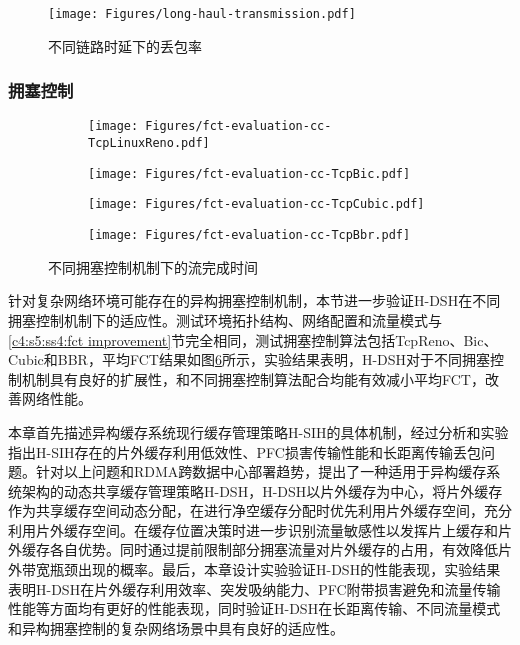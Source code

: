 \begin{figure}[H]
  \centering
  \texttt{[image: Figures/long-haul-transmission.pdf]}
  \caption{不同链路时延下的丢包率}
  \label{c4:s1:ss1:lossless distance}
\end{figure}

\subsubsection{拥塞控制}

\begin{figure}[H]
  \begin{subfigure}[b]{0.47\linewidth}
      \centering
      \texttt{[image: Figures/fct-evaluation-cc-TcpLinuxReno.pdf]}
      \label{c3:s6:ss1:fig:sub1:fct tcp reno}
  \end{subfigure}
  \begin{subfigure}[b]{0.47\linewidth}
      \centering
      \texttt{[image: Figures/fct-evaluation-cc-TcpBic.pdf]}
      \label{c3:s6:ss1:fig:sub1:fct tcp bic}
  \end{subfigure}
  \begin{subfigure}[b]{0.47\linewidth}
    \centering
    \texttt{[image: Figures/fct-evaluation-cc-TcpCubic.pdf]}
    \label{c3:s6:ss1:fig:sub1:fct tcp cubic}
  \end{subfigure}
  \begin{subfigure}[b]{0.47\linewidth}
    \centering
    \texttt{[image: Figures/fct-evaluation-cc-TcpBbr.pdf]}
    \label{c3:s6:ss1:fig:sub1:fct tcp bbr}
  \end{subfigure}  
  \caption{不同拥塞控制机制下的流完成时间}
  \label{c3:s6:ss1:fig:fct different cc}
\end{figure}

针对复杂网络环境可能存在的异构拥塞控制机制，本节进一步验证H-DSH在不同拥塞控制机制下的适应性。测试环境拓扑结构、网络配置和流量模式与\ref{c4:s5:ss4:fct improvement}节完全相同，测试拥塞控制算法包括TcpReno、Bic、Cubic和BBR，平均FCT结果如图\ref{c3:s6:ss1:fig:fct different cc}所示，实验结果表明，H-DSH对于不同拥塞控制机制具有良好的扩展性，和不同拥塞控制算法配合均能有效减小平均FCT，改善网络性能。



\label{c4:s6:brief summary}

本章首先描述异构缓存系统现行缓存管理策略H-SIH的具体机制，经过分析和实验指出H-SIH存在的片外缓存利用低效性、PFC损害传输性能和长距离传输丢包问题。针对以上问题和RDMA跨数据中心部署趋势，提出了一种适用于异构缓存系统架构的动态共享缓存管理策略H-DSH，H-DSH以片外缓存为中心，将片外缓存作为共享缓存空间动态分配，在进行净空缓存分配时优先利用片外缓存空间，充分利用片外缓存空间。在缓存位置决策时进一步识别流量敏感性以发挥片上缓存和片外缓存各自优势。同时通过提前限制部分拥塞流量对片外缓存的占用，有效降低片外带宽瓶颈出现的概率。最后，本章设计实验验证H-DSH的性能表现，实验结果表明H-DSH在片外缓存利用效率、突发吸纳能力、PFC附带损害避免和流量传输性能等方面均有更好的性能表现，同时验证H-DSH在长距离传输、不同流量模式和异构拥塞控制的复杂网络场景中具有良好的适应性。

\clearpage